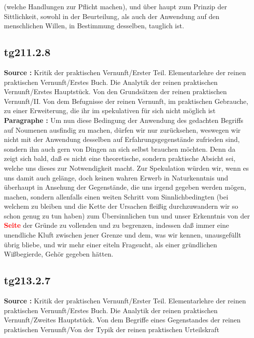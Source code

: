 \documentclass[a4paper,12pt,twoside]{book}
\newcommand{\match}[1]{\textcolor{red}{\textbf{#1}}}
\begin{document}
(welche Handlungen zur Pflicht machen), und über haupt zum Prinzip der Sittlichkeit, sowohl in der Beurteilung, als auch der Anwendung auf den menschlichen Willen, in Bestimmung desselben, tauglich ist. 
	
	\subsection*{tg211.2.8} 
	\textbf{Source : }Kritik der praktischen Vernunft/Erster Teil. Elementarlehre der reinen praktischen Vernunft/Erstes Buch. Die Analytik der reinen praktischen Vernunft/Erstes Hauptstück. Von den Grundsätzen der reinen praktischen Vernunft/II. Von dem Befugnisse der reinen Vernunft, im praktischen Gebrauche, zu einer Erweiterung, die ihr im spekulativen für sich nicht möglich ist\\  
	
	\noindent\textbf{Paragraphe : }Um nun diese Bedingung der Anwendung des gedachten Begriffs auf Noumenen ausfindig zu machen, dürfen wir nur zurücksehen, weswegen wir nicht mit der Anwendung desselben auf Erfahrungsgegenstände zufrieden sind, sondern ihn auch gern von Dingen an sich selbst brauchen möchten. Denn da zeigt sich bald, daß es nicht eine theoretische, sondern praktische Absicht sei, welche  uns dieses zur Notwendigkeit macht. Zur Spekulation würden wir, wenn es uns damit auch gelänge, doch keinen wahren Erwerb in Naturkenntnis und überhaupt in Ansehung der Gegenstände, die uns irgend gegeben werden mögen, machen, sondern allenfalls einen weiten Schritt vom Sinnlichbedingten (bei welchem zu bleiben und die Kette der Ursachen fleißig durchzuwandern wir so schon genug zu tun haben) zum Übersinnlichen tun und unser Erkenntnis von der \match{Seite} der Gründe zu vollenden und zu begrenzen, indessen daß immer eine unendliche Kluft zwischen jener Grenze und dem, was wir kennen, unausgefüllt übrig bliebe, und wir mehr einer eiteln Fragsucht, als einer gründlichen Wißbegierde, Gehör gegeben hätten. 
	
	\subsection*{tg213.2.7} 
	\textbf{Source : }Kritik der praktischen Vernunft/Erster Teil. Elementarlehre der reinen praktischen Vernunft/Erstes Buch. Die Analytik der reinen praktischen Vernunft/Zweites Hauptstück. Von dem Begriffe eines Gegenstandes der reinen praktischen Vernunft/Von der Typik der reinen praktischen Urteilskraft\\  
	
\end{document}
